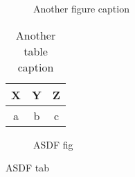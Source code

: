 \documentclass[12pt]{ucsddissertation}
\begin{document}

\begin{figure}
\centering
{}
\caption{Another figure caption}
\end{figure}
\begin{table}
\centering
\caption{Another table caption}
\begin{tabular}{ccc}
\toprule
X&Y&Z\\
\midrule
a&b&c\\
\bottomrule
\end{tabular}
\end{table}
\begin{figure}
\caption{ASDF fig}
\end{figure}
\begin{table}
\caption{ASDF tab}
\end{table}

\appendix

\backmatter


\end{document}
